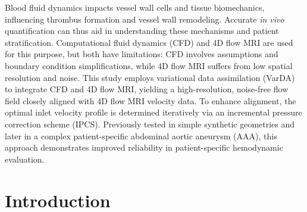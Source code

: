 Blood fluid dynamics impacts vessel wall cells and tissue biomechanics, influencing thrombus formation and vessel wall remodeling. Accurate \textit{in vivo} quantification can thus aid in understanding these mechanisms and patient stratification. Computational fluid dynamics (CFD) and 4D flow MRI are used for this purpose, but both have limitations: CFD involves assumptions and boundary condition simplifications, while 4D flow MRI suffers from low spatial resolution and noise. This study employs variational data assimilation (VarDA) to integrate CFD and 4D flow MRI, yielding a high-resolution, noise-free flow field closely aligned with 4D flow MRI velocity data. To enhance alignment, the optimal inlet velocity profile is determined iteratively via an incremental pressure correction scheme (IPCS). Previously tested in simple synthetic geometries and later in a complex patient-specific abdominal aortic aneurysm (AAA), this approach demonstrates improved reliability in patient-specific hemodynamic evaluation.


\section*{Introduction}

